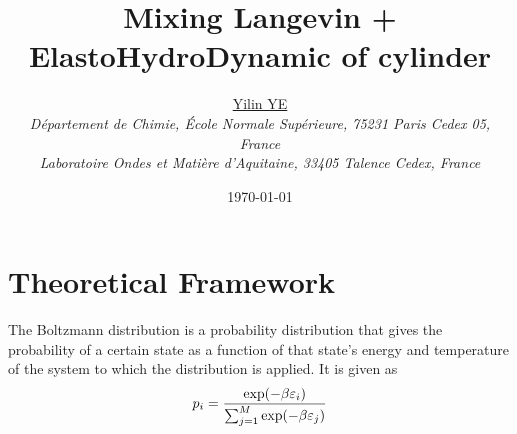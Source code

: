 \documentclass[books,12pt]{elegantpaper}
\title{\textcolor{ChimieBlue}{Mixing Langevin + ElastoHydroDynamic of cylinder}}
\author{\href{yilin.ye@ens.psl.eu}{{Yilin YE}}\\ \textit{\small{Département de Chimie, École Normale Supérieure, 75231 Paris Cedex 05, France}} \\ \textit{\small{Laboratoire Ondes et Matière d'Aquitaine, 33405 Talence Cedex, France}}}
\date{\today} %
\begin{document}
\maketitle






\setcounter{page}{1} %



\section{Theoretical Framework}
 The Boltzmann distribution is a probability distribution that gives the probability of a certain state as a function of that state's energy and temperature of the system to which the distribution is applied. It is given as
$$ p_i = \frac{\exp(-\beta \varepsilon_i)}{\sum_{j=1}^M \exp(-\beta \varepsilon_j)} $$

\end{document}
